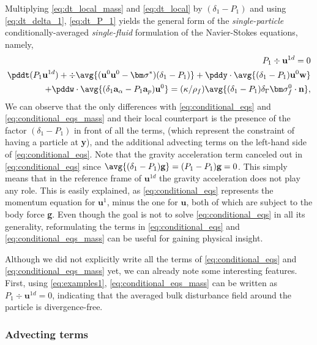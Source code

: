Multiplying \ref{eq:dt_local_mass} and \ref{eq:dt_local} by $(\delta_1 - P_1)$ and using \ref{eq:dt_delta_1},  \ref{eq:dt_P_1} yields the general form of the \textit{single-particle} conditionally-averaged \textit{single-fluid} formulation of the Navier-Stokes equations, namely,  
\begin{align}
    P_1 \div \textbf{u}^{1d}
    = 0 
    \label{eq:conditional_eqs_mass}
    \\
    \pddt (P_1 \textbf{u}^{1d})
    + \div \avg{(\textbf{u}^0 \textbf{u}^0 - \bm\sigma^*)(\delta_1 - P_1)} 
    + \pddy\cdot\avg{(\delta_1 - P_1)\textbf{u}^0 \textbf{w}}\nonumber \\ 
    + \pddw\cdot \avg{(\delta_1\textbf{a}_\alpha - P_1\textbf{a}_p) \textbf{u}^0}
    =  (\kappa / \rho_f) \avg{ (\delta_1 - P_1) \delta_\Gamma \bm\sigma_f^0\cdot \textbf{n}},
    \label{eq:conditional_eqs}
\end{align}
We can observe that the only differences with \ref{eq:conditional_eqs} and \ref{eq:conditional_eqs_mass} and their local counterpart is the presence of the factor $(\delta_1 - P_1)$ in front of all the terms, (which represent the constraint of having a particle at \textbf{y}), and the additional advecting terms on the left-hand side of \ref{eq:conditional_eqs}. 
Note that the gravity acceleration term canceled out in \ref{eq:conditional_eqs} since $\avg{(\delta_1 - P_1)\textbf{g}} = (P_1 -P_1 )\textbf{g} =0$. 
This simply means that in the reference frame of $\textbf{u}^{1d}$ the gravity acceleration does not play any role.
This is easily explained, as \ref{eq:conditional_eqs} represents the momentum equation for $\textbf{u}^{1}$, minus the one for $\textbf{u}$, both of which are subject to the body force \textbf{g}.
Even though the goal is not to solve \ref{eq:conditional_eqs} in all its generality, reformulating the terms in \ref{eq:conditional_eqs} and \ref{eq:conditional_eqs_mass} can be useful for gaining physical insight. 


Although we did not explicitly write all the terms of \ref{eq:conditional_eqs} and \ref{eq:conditional_eqs_mass} yet, we can already note some interesting features. 
First, using \ref{eq:examples1},  \ref{eq:conditional_eqs_mass} can be written as $P_1 \div \textbf{u}^{1d} =0$, indicating that the averaged bulk disturbance field around the particle is divergence-free.  

\subsubsection{Advecting terms}

